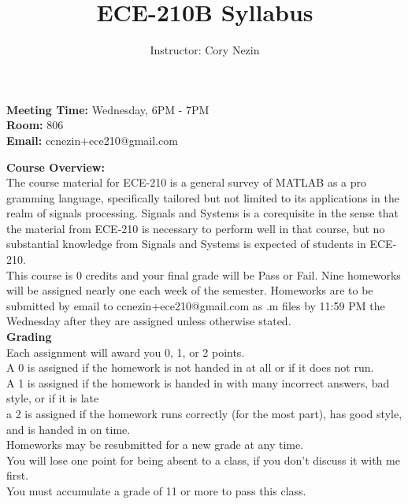 \documentclass[12pt]{article}
\begin{document}
\title{ECE-210B Syllabus}
\date{}
\author{Instructor: Cory Nezin}
\maketitle

\textbf{Meeting Time:} Wednesday, 6PM - 7PM \\
\textbf{Room:} 806 \\
\textbf{Email:} ccnezin+ece210@gmail.com

\textbf{Course Overview:}\\
The course material for ECE-210 is a general survey of MATLAB as a pro
gramming language, specifically tailored but not limited to its applications in the realm of signals
processing. Signals and Systems is a corequisite in the sense that the material from ECE-210 is
necessary to perform well in that course, but no substantial knowledge from Signals and Systems
is expected of students in ECE-210.\\

This course is 0 credits and your final grade will be Pass or Fail. Nine homeworks will be assigned
nearly one each week of the semester. Homeworks are to be submitted by email to ccnezin+ece210@gmail.com
as .m files by 11:59 PM the Wednesday after they are assigned unless otherwise stated.\\

\textbf{Grading}\\
Each assignment will award you 0, 1, or 2 points. \\

A 0 is assigned if the homework is not handed in at all or if it does not run. \\

A 1 is assigned if the homework is handed in with many incorrect answers, bad style, or if it is late\\

a 2 is assigned if the homework runs correctly (for the most part), has good style, and is handed in on time.\\

Homeworks may be resubmitted for a new grade at any time.\\

You will lose one point for being absent to a class, if you don't discuss it with me first.\\

You must accumulate a grade of 11 or more to pass this class.\\
\end{document}
